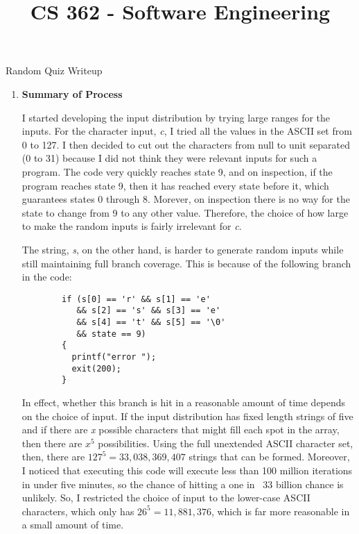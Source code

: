 \documentclass[11pt,letterpaper]{article}
\begin{document}
 \univlogo

\title{CS 362 - Software Engineering}
{\Huge Random Quiz Writeup}\\[5mm]

\begin{enumerate}
  \item \textbf{Summary of Process} 

      I started developing the input distribution by trying large ranges for the inputs. For
        the character input, \emph{c}, I tried all the values in the ASCII set from 0 to 127. I then
        decided to cut out the characters from null to unit separated (0 to 31) 
        because I did not think they were relevant inputs for such a program. 
        The code very quickly reaches state 9, and on inspection, if the
        program reaches state 9, then it has reached every state before it, which
        guarantees states 0 through 8. Morever, on inspection there is no way
        for the state to change from 9 to any other value.  Therefore, the choice of how large to 
        make the random inputs is fairly irrelevant for \emph{c}. 

        The string, \emph{s}, on the other hand, is harder to generate random
        inputs while still maintaining full branch coverage. This is because
        of the following branch in the code: 
        \begin{lstlisting}
        if (s[0] == 'r' && s[1] == 'e'
           && s[2] == 's' && s[3] == 'e'
           && s[4] == 't' && s[5] == '\0'
           && state == 9)
        {
          printf("error ");
          exit(200);
        }
        \end{lstlisting}

        In effect, whether this branch is hit in a reasonable amount of time
        depends on the choice of input. If the input distribution has fixed
        length strings of five and if there are \emph{x} possible characters that
        might fill each spot in the array, then there are $ x^5 $
        possibilities. Using the full unextended ASCII character set, then, 
        there are $127 ^ 5 = 33,038,369,407$ strings that can be formed. 
        Moreover, I noticed that executing this code 
        will execute less than 100 million iterations in under five minutes,
        so the chance of hitting a one in ~33 billion chance is unlikely. So,
        I restricted the choice of input to the lower-case ASCII characters,
        which only has $26^5 = 11,881,376$, which is far more reasonable in 
        a small amount of time. 


\end{enumerate}
\end{document}
